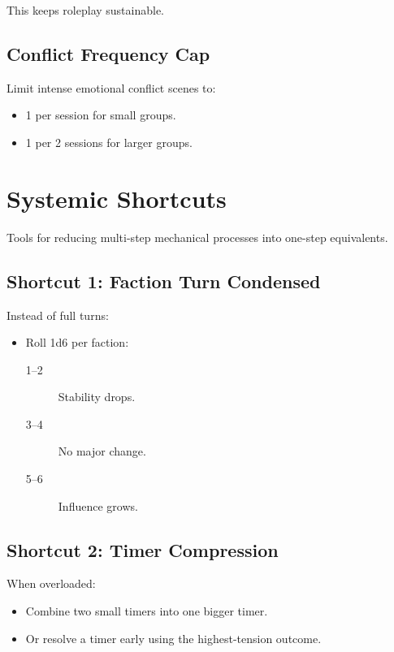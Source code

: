 \documentclass[11pt]{article}
\begin{document}
This keeps roleplay sustainable.

\subsection{Conflict Frequency Cap}

Limit intense emotional conflict scenes to:
\begin{itemize}
    \item 1 per session for small groups.
    \item 1 per 2 sessions for larger groups.
\end{itemize}


\section{Systemic Shortcuts}
\label{appendix:shortcuts}

Tools for reducing multi-step mechanical processes into one-step equivalents.

\subsection{Shortcut 1: Faction Turn Condensed}
Instead of full turns:
\begin{itemize}
    \item Roll 1d6 per faction:
    \begin{description}
        \item[1--2] Stability drops.
        \item[3--4] No major change.
        \item[5--6] Influence grows.
    \end{description}
\end{itemize}

\subsection{Shortcut 2: Timer Compression}

When overloaded:
\begin{itemize}
    \item Combine two small timers into one bigger timer.
    \item Or resolve a timer early using the highest-tension outcome.
\end{itemize}
\end{document}

